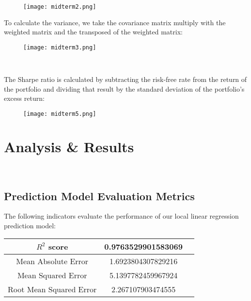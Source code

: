 \documentclass[11pt, oneside]{article}   	%
\begin{document}
\begin{figure}[! h] %
   \centering
   \texttt{[image: midterm2.png]} 
\end{figure}

\FloatBarrier

To calculate the variance, we take the covariance matrix multiply with the weighted matrix and the transposed of the weighted matrix:

\begin{figure}[! h] %
   \centering
   \texttt{[image: midterm3.png]} 
\end{figure}\


The Sharpe ratio is calculated by subtracting the risk-free rate from the return of the portfolio and dividing that result by the standard deviation of the portfolio’s excess return:

\begin{figure}[htbp] %
   \centering
   \texttt{[image: midterm5.png]} 
\end{figure}



\newpage

\section{Analysis \& Results}\

\subsection{Prediction Model Evaluation Metrics}

The following indicators evaluate the performance of our local linear regression prediction model:\\

\begin{center}
\begin{tabular}{ |c|c|c| } 
 \hline
 $R^2$ score & 0.9763529901583069 \\ 
 \hline
 Mean Absolute Error & 1.6923804307829216 \\ 
 \hline
 Mean Squared Error & 5.1397782459967924 \\ 
 \hline
 Root Mean Squared Error & 2.267107903474555 \\
 \hline
 \end{tabular}
\end{center}
\end{document}
